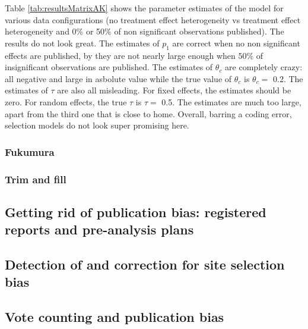 \documentclass[
]{book}
\theoremstyle{definition}
\theoremstyle{definition}
\theoremstyle{definition}
\theoremstyle{definition}
\theoremstyle{remark}
\begin{document}
Table \ref{tab:resultsMatrixAK} shows the parameter estimates of the model for various data configurations (no treatment effect heterogeneity vs treatment effect heterogeneity and 0\% or 50\% of non significant observations published).
The results do not look great.
The estimates of \(p_1\) are correct when no non significant effects are published, by they are not nearly large enough when \(50\%\) of insignificant observations are published.
The estimates of \(\theta_c\) are completely crazy: all negative and large in asbolute value while the true value of \(\theta_c\) is \(\theta_c=\) 0.2.
The estimates of \(\tau\) are also all misleading.
For fixed effects, the estimates should be zero.
For random effects, the true \(\tau\) is \(\tau=\) 0.5.
The estimates are much too large, apart from the third one that is close to home.
Overall, barring a coding error, selection models do not look super promising here.

\hypertarget{fukumura}{%
\subsubsection{Fukumura}\label{fukumura}}

\hypertarget{trim-and-fill}{%
\subsubsection{Trim and fill}\label{trim-and-fill}}

\hypertarget{getting-rid-of-publication-bias-registered-reports-and-pre-analysis-plans}{%
\subsection{Getting rid of publication bias: registered reports and pre-analysis plans}\label{getting-rid-of-publication-bias-registered-reports-and-pre-analysis-plans}}

\hypertarget{detection-of-and-correction-for-site-selection-bias}{%
\subsection{Detection of and correction for site selection bias}\label{detection-of-and-correction-for-site-selection-bias}}

\hypertarget{vote-counting-and-publication-bias}{%
\subsection{Vote counting and publication bias}\label{vote-counting-and-publication-bias}}
\end{document}

